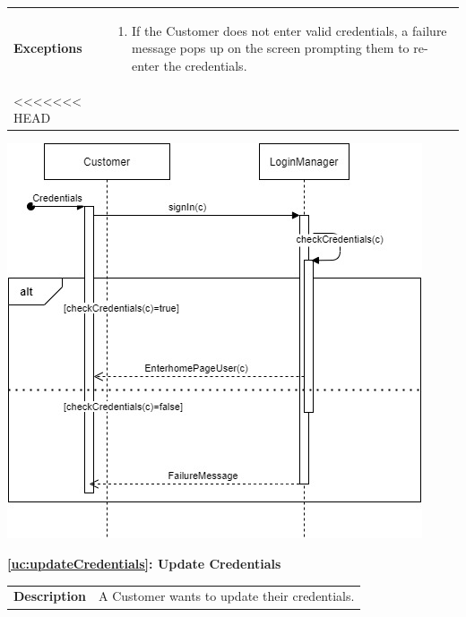 \documentclass[a4paper, 12pt, oneside]{article}
\begin{document}
\begin{enumerate}[labelindent=20pt, label={UC.\arabic*}, itemindent=1em,leftmargin=!]
\begin{tabularx}{\linewidth}{| l | X |}
    \hline
    \textbf{Exceptions} & \parbox{0.7\textwidth}{ \begin{enumerate}
            \item If the Customer does not enter valid credentials, a failure message pops up on the screen prompting them to re-enter the credentials.
        \end{enumerate}}\\

<<<<<<< HEAD
    \hline
    
\end{tabularx}

\begin{minipage}{\linewidth}
            \centering
           \includegraphics[height=0.47\textheight, scale=1, keepaspectratio]{img/seq_diag/Login.jpg}
\end{minipage}

\begin{center}
{\textbf{\ref{uc:updateCredentials}: Update Credentials}}
\end{center}
\begin{tabularx}{\linewidth}{| l | X |}
    
    \hline
    \textbf{Description} & A Customer wants to update their credentials.\\
    

\end{tabularx}
\end{enumerate}
\end{document}
